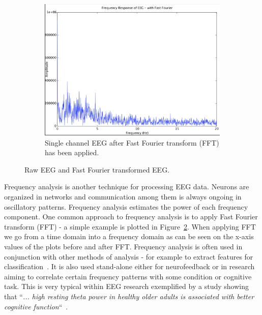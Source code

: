 \documentclass[a4paper,10pt,english,lof,lot,twoside]{puthesis}
\begin{document}
\begin{figure}
\begin{subfigure}[t]{0.48\linewidth}
\includegraphics[width=1.000\linewidth]{mindwave_eeg_fft.png}
\caption[Single channel raw EEG applied FFT]{Single channel EEG after Fast Fourier transform (FFT) has been applied.}\label{ch-background/index:fig-background-mindwave-eeg-fft}\end{subfigure}
\caption[Raw EEG and processed EEG]{Raw EEG and Fast Fourier transformed EEG.}\label{ch-background/index:fig-background-eeg-raw-fft}

\end{figure}


Frequency analysis is another technique for processing EEG data.
Neurons are organized in networks and communication among them is always ongoing
in oscillatory patterns. Frequency analysis estimates the power of each
frequency component. One common approach to frequency analysis is to apply Fast
Fourier transform (FFT) - a simple example is plotted in Figure \ref{ch-background/index:fig-background-eeg-raw-fft}. When applying FFT we go from a time domain
into a frequency domain as can be seen on the x-axis values of the plots before
and after FFT. Frequency analysis is often used in conjunction with
other methods of analysis - for example to extract features for classification \cite{tong_quantitative_2009}. It is also used stand-alone either for
neurofeedback or in research aiming to correlate certain frequency patterns with
some condition or cognitive task. This is very typical within EEG research
exemplified by a study showing that ``\emph{... high resting theta power in healthy
older adults is associated with better cognitive function}`` \cite{finnigan_resting_2011}.
\end{document}
